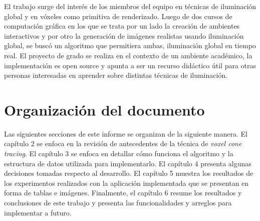 El trabajo surge del interés de los miembros del equipo en técnicas de iluminación global y en vóxeles como primitiva de renderizado.
Luego de dos cursos de computación gráfica en los que se trata por un lado la creación de ambientes interactivos y por otro la generación de imágenes realistas usando iluminación global, se buscó un algoritmo que permitiera ambas, iluminación global en tiempo real.
El proyecto de grado se realiza en el contexto de un ambiente académico, la implementación es open source y apunta a ser un recurso didáctico útil para otras personas interesadas en aprender sobre distintas técnicas de iluminación.

\section{Organización del documento}

Las siguientes secciones de este informe se organizan de la siguiente manera.
El capítulo 2 se enfoca en la revisión de antecedentes de la técnica de \textit{voxel cone tracing}.
El capítulo 3 se enfoca en detallar cómo funciona el algoritmo y la estructura de datos utilizada para implementarlo.
El capítulo 4 presenta algunas decisiones tomadas respecto al desarrollo.
El capítulo 5 muestra los resultados de los experimentos realizados con la aplicación implementada que se presentan en forma de tablas e imágenes.
Finalmente, el capítulo 6 resume los resultados y conclusiones de este trabajo y presenta las funcionalidades y arreglos para implementar a futuro.
